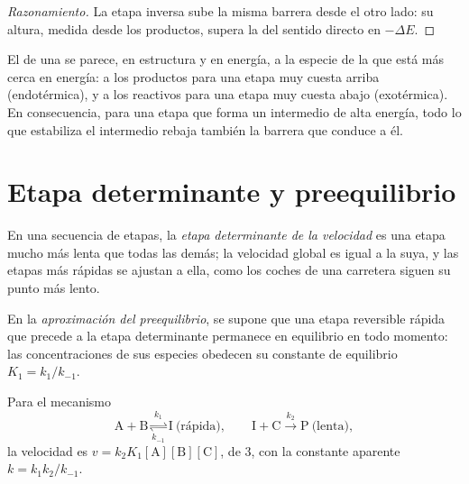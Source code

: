 \begin{proof}[Razonamiento]
La etapa inversa sube la misma barrera desde el otro lado: su altura,
medida desde los productos, supera la del sentido directo en $-\Delta E$.
\end{proof}

\begin{proposition}\label{prop:b1:elementary-steps:hammond}
El  de una  se parece, en estructura y
en energía, a la especie de la que está más cerca en energía: a los
productos para una etapa muy cuesta arriba (endotérmica), y a los
reactivos para una etapa muy cuesta abajo (exotérmica). En consecuencia,
para una etapa que forma un intermedio de alta energía, todo lo que
estabiliza el intermedio rebaja también la barrera que conduce a él.
\end{proposition}
\admitted

\section{Etapa determinante y preequilibrio}

\begin{definition}\label{def:b1:elementary-steps:rds}
En una secuencia de etapas, la \emph{etapa determinante de la
velocidad} es una etapa mucho
más lenta que todas las demás; la velocidad global es igual a la suya, y
las etapas más rápidas se ajustan a ella, como los coches de una
carretera siguen su punto más lento.
\end{definition}

\begin{definition}\label{def:b1:elementary-steps:pre-equilibrium}
En la \emph{aproximación del preequilibrio},
se supone que una etapa reversible rápida que precede a la etapa
determinante permanece en equilibrio en todo momento: las concentraciones
de sus especies obedecen su constante de equilibrio $K_1 = k_1/k_{-1}$.
\end{definition}

\begin{proposition}\label{prop:b1:elementary-steps:pre-equilibrium-law}
Para el mecanismo
\[
  \mathrm{A} + \mathrm{B} \underset{k_{-1}}{\overset{k_1}{\rightleftharpoons}} \mathrm{I}
  \ \text{(rápida)}, \qquad
  \mathrm{I} + \mathrm{C} \xrightarrow{\ k_2\ } \mathrm{P} \ \text{(lenta)},
\]
la velocidad es $v = k_2K_1[\mathrm{A}][\mathrm{B}][\mathrm{C}]$, de  3, con la constante aparente $k = k_1k_2/k_{-1}$.
\end{proposition}

